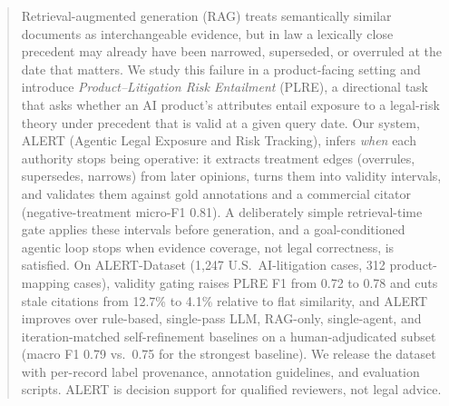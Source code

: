 \begin{abstract}
Retrieval-augmented generation (RAG) treats semantically similar documents as interchangeable evidence, but in law a lexically close precedent may already have been narrowed, superseded, or overruled at the date that matters. We study this failure in a product-facing setting and introduce \emph{Product--Litigation Risk Entailment} (PLRE), a directional task that asks whether an AI product's attributes entail exposure to a legal-risk theory under precedent that is valid at a given query date. Our system, ALERT (Agentic Legal Exposure and Risk Tracking), infers \emph{when} each authority stops being operative: it extracts treatment edges (overrules, supersedes, narrows) from later opinions, turns them into validity intervals, and validates them against gold annotations and a commercial citator (negative-treatment micro-F1 0.81). A deliberately simple retrieval-time gate applies these intervals before generation, and a goal-conditioned agentic loop stops when evidence coverage, not legal correctness, is satisfied. On ALERT-Dataset (1{,}247 U.S.\ AI-litigation cases, 312 product-mapping cases), validity gating raises PLRE F1 from 0.72 to 0.78 and cuts stale citations from 12.7\% to 4.1\% relative to flat similarity, and ALERT improves over rule-based, single-pass LLM, RAG-only, single-agent, and iteration-matched self-refinement baselines on a human-adjudicated subset (macro F1 0.79 vs.\ 0.75 for the strongest baseline). We release the dataset with per-record label provenance, annotation guidelines, and evaluation scripts. ALERT is decision support for qualified reviewers, not legal advice.
\end{abstract}
